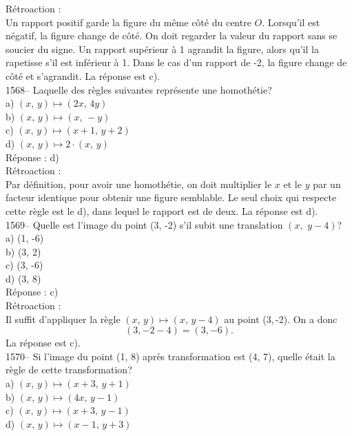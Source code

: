 R\'etroaction :\\
Un rapport positif garde la figure du m\^eme c\^ot\'e du centre $O$.
Lorsqu'il est n\'egatif, la figure change de c\^ot\'e. \vskip 15pt
\noindent On doit regarder la valeur du rapport sans se soucier du
signe. Un rapport sup\'erieur \`a  1 agrandit la figure, alors qu'il
la rapetisse s'il est inf\'erieur \`a 1. \vskip 15pt \noindent Dans
le cas d'un rapport de -2, la figure change de c\^ot\'e et
s'agrandit. La r\'eponse est c).\\

1568-- Laquelle des r\`egles suivantes repr\'esente une homoth\'etie?\\
a) $(x,\,y)\mapsto(2x,\,4y)$\\
b) $(x,\,y)\mapsto(x,\,-y)$\\
c) $(x,\,y)\mapsto(x+1,\,y+2)$\\
d) $(x,\,y)\mapsto 2\cdot(x,\,y)$\\

R\'eponse : d)\\

R\'etroaction :\\
Par d\'efinition, pour avoir une homoth\'etie, on doit multiplier le $x$ et
le $y$ par un facteur identique pour obtenir une figure semblable. Le seul
choix qui respecte cette r\`egle est le d), dans lequel le rapport est de
deux. La r\'eponse est d).\\

1569-- Quelle est l'image du point (3, -2) s'il subit une translation
$(x,\,\,y-4)$?\\
a) (1, -6)\\
b) (3, 2) \\
c) (3, -6)\\
d) (3, 8)\\

R\'eponse : c)\\

R\'etroaction :\\
Il suffit d'appliquer la r\`egle $(x,\,y)\mapsto(x,\,y-4)$ au point
(3,\,-2). On a
donc $$(3, -2-4)=(3, -6).$$ La r\'eponse est c).\\

1570-- Si l'image du point (1, 8) apr\`es transformation est (4, 7), quelle
\'etait la r\`egle de cette transformation?\\
a) $(x,\,y)\mapsto(x+3,\,y+1)$\\
b) $(x,\,y)\mapsto(4x,\,y-1)$\\
c) $(x,\,y)\mapsto(x+3,\,y-1)$\\
d) $(x,\,y)\mapsto(x-1,\,y+3)$\\

